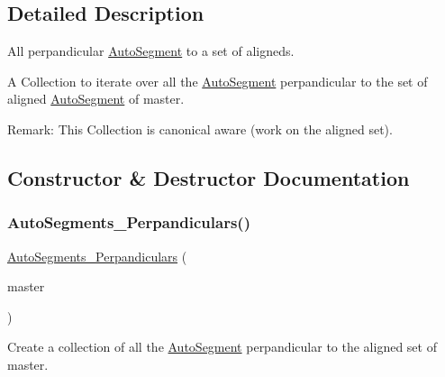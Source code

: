 \subsection{Detailed Description}
All perpandicular \hyperlink{classKatabatic_1_1AutoSegment}{Auto\+Segment} to a set of aligneds. 

A Collection to iterate over all the \hyperlink{classKatabatic_1_1AutoSegment}{Auto\+Segment} perpandicular to the set of aligned \hyperlink{classKatabatic_1_1AutoSegment}{Auto\+Segment} of {\ttfamily master}.

\begin{DoxyParagraph}{Remark\+:}
This Collection is canonical aware (work on the aligned set). 
\end{DoxyParagraph}


\subsection{Constructor \& Destructor Documentation}
\mbox{\label{classKatabatic_1_1AutoSegments__Perpandiculars_ab5cb1a0042b95cb6bd56997cdfbf0e6f}} 
\subsubsection{\texorpdfstring{Auto\+Segments\+\_\+\+Perpandiculars()}{AutoSegments\_Perpandiculars()}\hspace{0.1cm}{\footnotesize\ttfamily [1/2]}}
{\footnotesize\ttfamily \hyperlink{classKatabatic_1_1AutoSegments__Perpandiculars}{Auto\+Segments\+\_\+\+Perpandiculars} (\begin{DoxyParamCaption}\item[{\hyperlink{classKatabatic_1_1AutoSegment}{Auto\+Segment} $\ast$}]{master }\end{DoxyParamCaption})\hspace{0.3cm}{\ttfamily [inline]}}

Create a collection of all the \hyperlink{classKatabatic_1_1AutoSegment}{Auto\+Segment} perpandicular to the aligned set of {\ttfamily master}. \mbox{\label{classKatabatic_1_1AutoSegments__Perpandiculars_ac2d21dfaa510352fb5c1bd9aa9bd6f94}} 
